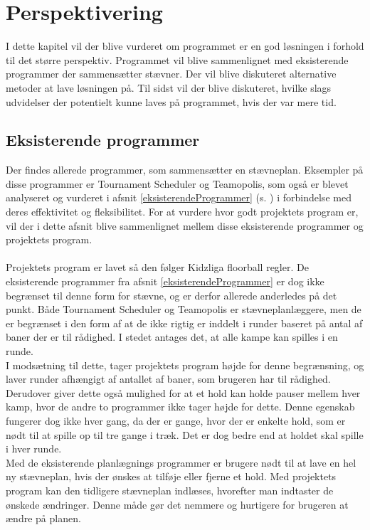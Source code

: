 \chapter{Perspektivering}\label{ch:chlabel}
I dette kapitel vil der blive vurderet om programmet er en god løsningen i forhold til det større perspektiv. Programmet vil blive sammenlignet med eksisterende programmer der sammensætter stævner. Der vil blive diskuteret alternative metoder at lave løsningen på. Til sidst vil der blive diskuteret, hvilke slags udvidelser der potentielt kunne laves på programmet, hvis der var mere tid. 

\section*{Eksisterende programmer}
Der findes allerede programmer, som sammensætter en stævneplan. Eksempler på disse programmer er Tournament Scheduler og Teamopolis, som også er blevet analyseret og vurderet i afsnit \ref{eksisterendeProgrammer} (s. \pageref{eksisterendeProgrammer}) i forbindelse med deres effektivitet og fleksibilitet. For at vurdere hvor godt projektets program er, vil der i dette afsnit blive sammenlignet mellem disse eksisterende programmer og projektets program.
\\\\
Projektets program er lavet så den følger Kidzliga floorball regler. De eksisterende programmer fra afsnit \ref{eksisterendeProgrammer} er dog ikke begrænset til denne form for stævne, og er derfor allerede anderledes på det punkt. Både Tournament Scheduler og Teamopolis er stævneplanlæggere, men de er begrænset i den form af at de ikke rigtig er inddelt i runder baseret på antal af baner der er til rådighed. I stedet antages det, at alle kampe kan spilles i en runde. 
\\
I modsætning til dette, tager projektets program højde for denne begrænsning, og laver runder afhængigt af antallet af baner, som brugeren har til rådighed. Derudover giver dette også mulighed for at et hold kan holde pauser mellem hver kamp, hvor de andre to programmer ikke tager højde for dette. Denne egenskab fungerer dog ikke hver gang, da der er gange, hvor der er enkelte hold, som er nødt til at spille op til tre gange i træk. Det er dog bedre end at holdet skal spille i hver runde. 
\\
Med de eksisterende planlægnings programmer er brugere nødt til at lave en hel ny stævneplan, hvis der ønskes at tilføje eller fjerne et hold. Med projektets program kan den tidligere stævneplan indlæses, hvorefter man indtaster de ønskede ændringer. Denne måde gør det nemmere og hurtigere for brugeren at ændre på planen.
